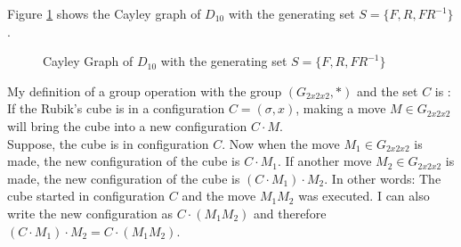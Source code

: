 \begin{example}
Figure \ref{fig:D10} shows the Cayley graph of $D_{10}$ with the generating set $S= \{F, R, FR^{-1}\}$. 

 \begin{figure}[H]
\centering
    \caption{Cayley Graph of $D_{10}$ with the generating set $S= \{F, R, FR^{-1}\}$}
    \label{fig:D10}
\end{figure}

\end{example}


My definition of a group operation with the group $(G_{2x2x2}, \scriptstyle * )$ and the set $C$ is : \\
If the Rubik's cube is in a configuration $C=(\sigma, x)$, making a move $M \in G_{2x2x2}$ will bring the cube into a new configuration  $C \cdot M$. 
\\
Suppose, the cube is in configuration $C$. Now when the move $M_1 \in G_{2x2x2}$ is made, the new configuration of the cube is $C \cdot M_1$. If another move $M_2 \in G_{2x2x2}$ is made, the new configuration of the cube is $(C \cdot M_1) \cdot M_2$. 
In other words: The cube started in configuration $C$ and the move $M_1 M_2$ was executed. I can also write the new configuration as $C \cdot (M_1 M_2)$ and therefore $(C \cdot M_1) \cdot M_2 = C \cdot (M_1 M_2)$. 

